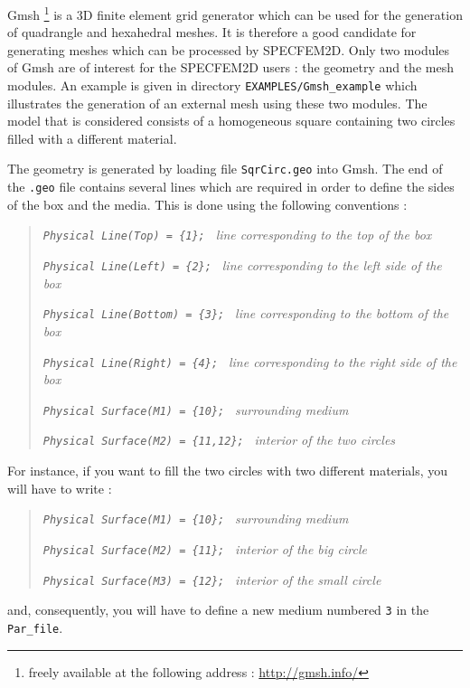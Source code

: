 Gmsh%
\footnote{freely available at the following address : \url{http://gmsh.info/}}
is a 3D finite element grid generator which can be used for the generation
of quadrangle and hexahedral meshes. It is therefore a good candidate
for generating meshes which can be processed by SPECFEM2D. Only two
modules of Gmsh are of interest for the SPECFEM2D users : the geometry
and the mesh modules. An example is given in directory \texttt{EXAMPLES/Gmsh\_example}
which illustrates the generation of an external mesh using these two
modules. The model that is considered consists of a homogeneous
square containing two circles filled with a different material.

The geometry is generated by loading file \texttt{SqrCirc.geo} into
Gmsh. The end of the \texttt{.geo} file contains several lines which
are required in order to define the sides of the box and the media.
This is done using the following conventions :
%
\begin{quote}
\texttt{\textit{Physical Line(\textquotedbl Top\textquotedbl)
= \{1\}; }}
\textsf{\textit{\small line corresponding to the top of the box}}

\texttt{\textit{Physical Line(\textquotedbl Left\textquotedbl)
= \{2\}; }}
\textsf{\textit{\small line corresponding to the left side of the box}}

\texttt{\textit{Physical Line(\textquotedbl Bottom\textquotedbl)
= \{3\}; }}
\textsf{\textit{\small line corresponding to the bottom of the box}}

\texttt{\textit{Physical Line(\textquotedbl Right\textquotedbl)
= \{4\}; }}
\textsf{\textit{\small line corresponding to the right side of the box}}

\texttt{\textit{Physical Surface(\textquotedbl M1\textquotedbl)
= \{10\}; }}
\textsf{\textit{\small surrounding medium}}

\texttt{\textit{Physical Surface(\textquotedbl M2\textquotedbl)
= \{11,12\}; }}
\textsf{\textit{\small interior of the two circles}}
\end{quote}
%
For instance, if you want to fill the two circles with two different
materials, you will have to write :
%
\begin{quote}
\texttt{\textit{Physical Surface(\textquotedbl M1\textquotedbl)
= \{10\}; }}
\textsf{\textit{\small surrounding medium}}

\texttt{\textit{Physical Surface(\textquotedbl M2\textquotedbl)
= \{11\}; }}
\textsf{\textit{\small interior of the big circle}}

\texttt{\textit{Physical Surface(\textquotedbl M3\textquotedbl)
= \{12\}; }}
\textsf{\textit{\small interior of the small circle}}
\end{quote}
%
and, consequently, you will have to define a new medium numbered \texttt{3}
in the \texttt{Par\_file}.

